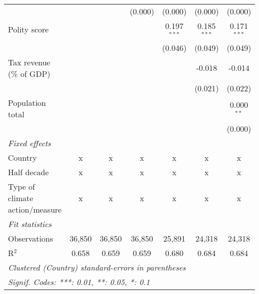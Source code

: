 \begin{tabular}{lcccccc}
                                                                                    &                &               & (0.000)        & (0.000)        & (0.000)        & (0.000)\\   
   Polity score                                                                     &                &               &                & 0.197$^{***}$  & 0.185$^{***}$  & 0.171$^{***}$\\   
                                                                                    &                &               &                & (0.046)        & (0.049)        & (0.049)\\   
   Tax revenue (\% of GDP)                                                          &                &               &                &                & -0.018         & -0.014\\   
                                                                                    &                &               &                &                & (0.021)        & (0.022)\\   
   Population total                                                                 &                &               &                &                &                & 0.000$^{**}$\\   
                                                                                    &                &               &                &                &                & (0.000)\\   
   \emph{Fixed effects}\\
   Country                                                                          & x              & x             & x              & x              & x              & x\\  
   Half decade                                                                      & x              & x             & x              & x              & x              & x\\  
   Type of climate action/measure                                                   & x              & x             & x              & x              & x              & x\\  
   \midrule \emph{Fit statistics}\\
   Observations                                                                     & 36,850         & 36,850        & 36,850         & 25,891         & 24,318         & 24,318\\  
   R$^2$                                                                            & 0.658          & 0.659         & 0.659          & 0.680          & 0.684          & 0.684\\  
   \midrule
   \multicolumn{7}{l}{\emph{Clustered (Country) standard-errors in parentheses}}\\
   \multicolumn{7}{l}{\emph{Signif. Codes: ***: 0.01, **: 0.05, *: 0.1}}\\
\end{tabular}
\par\endgroup


